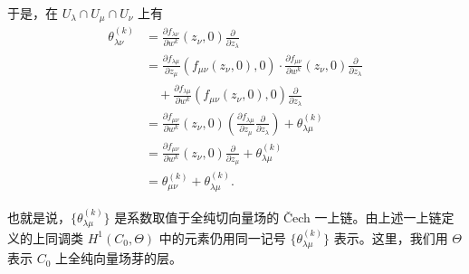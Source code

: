 
于是，在 $U_\lambda\cap U_\mu\cap U_\nu$ 上有
\[
\begin{aligned}
\theta^{(k)}_{\lambda\nu}
&= \frac{\partial f_{\lambda\nu}}{\partial w^k}(z_\nu,0)\frac{\partial}{\partial z_\lambda}\\
&= \frac{\partial f_{\lambda\mu}}{\partial z_\mu}(f_{\mu\nu}(z_\nu,0),0)\cdot\frac{\partial f_{\mu\nu}}{\partial w^k}(z_\nu,0)\frac{\partial}{\partial z_\lambda}\\
&\quad +\frac{\partial f_{\lambda\mu}}{\partial w^k}(f_{\mu\nu}(z_\nu,0),0)\frac{\partial}{\partial z_\lambda}\\
&= \frac{\partial f_{\mu\nu}}{\partial w^k}(z_\nu,0)\left(\frac{\partial f_{\lambda\mu}}{\partial z_\mu}\frac{\partial}{\partial z_\lambda}\right)+\theta^{(k)}_{\lambda\mu}\\
&= \frac{\partial f_{\mu\nu}}{\partial w^k}(z_\nu,0)\frac{\partial}{\partial z_\mu}+\theta^{(k)}_{\lambda\mu}\\
&= \theta^{(k)}_{\mu\nu}+\theta^{(k)}_{\lambda\mu}.
\end{aligned}
\]

也就是说，$\{\theta^{(k)}_{\lambda\mu}\}$ 是系数取值于全纯切向量场的 Čech 一上链。由上述一上链定义的上同调类 $H^1(C_0,\Theta)$ 中的元素仍用同一记号 $\{\theta^{(k)}_{\lambda\mu}\}$ 表示。这里，我们用 $\Theta$ 表示 $C_0$ 上全纯向量场芽的层。



